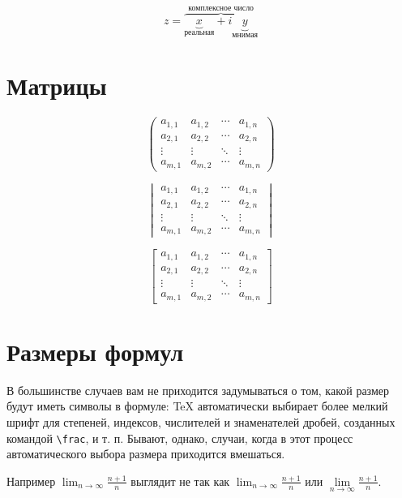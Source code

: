\documentclass[12pt, a4paper]{article}
\begin{document}
\[
 z = \overbrace{
   \underbrace{x}_\text{реальная} + i
   \underbrace{y}_\text{мнимая}
  }^\text{комплексное число}
\]







\section{Матрицы}

\[
 \begin{pmatrix}
  a_{1,1} & a_{1,2} & \cdots & a_{1,n} \\
  a_{2,1} & a_{2,2} & \cdots & a_{2,n} \\
  \vdots  & \vdots  & \ddots & \vdots  \\
  a_{m,1} & a_{m,2} & \cdots & a_{m,n} 
 \end{pmatrix}
\]

\[
 \begin{vmatrix}
  a_{1,1} & a_{1,2} & \cdots & a_{1,n} \\
  a_{2,1} & a_{2,2} & \cdots & a_{2,n} \\
  \vdots  & \vdots  & \ddots & \vdots  \\
  a_{m,1} & a_{m,2} & \cdots & a_{m,n} 
 \end{vmatrix}
\]

\[
 \begin{bmatrix}
  a_{1,1} & a_{1,2} & \cdots & a_{1,n} \\
  a_{2,1} & a_{2,2} & \cdots & a_{2,n} \\
  \vdots  & \vdots  & \ddots & \vdots  \\
  a_{m,1} & a_{m,2} & \cdots & a_{m,n} 
 \end{bmatrix}
\]






\section{Размеры формул}

В большинстве случаев вам не приходится задумываться о том, какой размер будут иметь символы в формуле: \TeX{} автоматически выбирает более мелкий шрифт для степеней, индексов, числителей и знаменателей дробей, созданных командой \verb|\frac|, и т. п. Бывают, однако, случаи, когда в этот процесс автоматического выбора размера приходится вмешаться.

Например $\lim_{n \to \infty} \frac{n+1}{n}$ выглядит не так как $\displaystyle \lim_{n \to \infty} \frac{n+1}{n}$ или $\lim\limits_{n \to \infty} \frac{n+1}{n}$.
\end{document}
